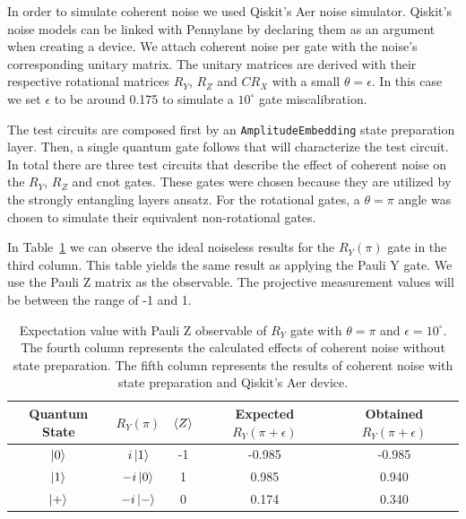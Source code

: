 In order to simulate coherent noise we used Qiskit's Aer noise simulator.
Qiskit's noise models can be linked with Pennylane by declaring them as
an argument when creating a device. We attach coherent noise per gate
with the noise's corresponding unitary matrix. The unitary matrices are
derived with their respective rotational matrices \(R_{Y}\), \(R_{Z}\) and 
\(CR_{X}\) with a small \(\theta = \epsilon\). In this case we set 
\(\epsilon\) to be around 0.175 to simulate a \(10^{\circ}\) gate
miscalibration. \

The test circuits are composed first by an
\colorbox{inline_gray}{\lstinline|AmplitudeEmbedding|} state preparation
layer. Then, a single quantum gate follows that will characterize the
test circuit. In total there are three test circuits that describe the
effect of coherent noise on the \(R_{Y}\), \(R_{Z}\) and \ac{cnot} gates.
These gates were chosen because they are utilized by the strongly
entangling layers ansatz. For the rotational gates, a \(\theta = \pi\)
angle was chosen to simulate their equivalent non-rotational gates. \

In Table~\ref{tab:ry_noise} we can observe the ideal noiseless results
for the \(R_{Y}(\pi)\) gate in the third column. This table yields the
same result as applying the Pauli Y gate. We use the Pauli Z matrix as
the observable. The projective measurement values will be between the
range of -1 and 1. \

\begin{table}[h]
  \centering
  \begin{tabular}{|c|c|c|c|c|}
    \hline
    Quantum State & \(R_{Y}\left(\pi\right)\) & \(\expval{Z}\) & Expected \(R_{Y}\left(\pi+\epsilon\right)\) & Obtained \(R_{Y}\left(\pi+\epsilon\right)\) \\
    \hline
    \(\ket{0}\) & \(i\ket{1}\)  & -1 & -0.985 & -0.985 \\
    \hline
    \(\ket{1}\) & \(-i\ket{0}\) &  1 &  0.985 &  0.940 \\
    \hline
    \(\ket{+}\) & \(-i\ket{-}\) &  0 &  0.174 &  0.340 \\
    \hline
  \end{tabular}
  \caption{Expectation value with Pauli Z observable of \(R_{Y}\) gate with \(\theta = \pi\) and \(\epsilon = 10^{\circ}\).
  The fourth column represents the calculated effects of coherent noise without state preparation.
  The fifth column represents the results of coherent noise with state preparation and Qiskit's Aer device.}\label{tab:ry_noise}
\end{table} \


